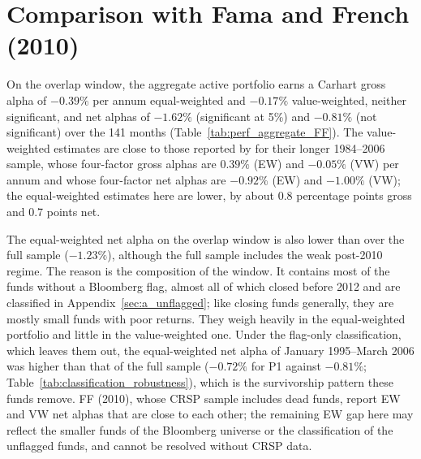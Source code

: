 \documentclass[12pt, oneside]{report}
\begin{document}








\section{Comparison with Fama and French (2010)}
\label{sec:ff_comparison}

\noindent On the overlap window, the aggregate active portfolio earns a
Carhart gross alpha of $-0.39\%$ per annum equal-weighted and $-0.17\%$
value-weighted, neither significant, and net alphas of $-1.62\%$
(significant at 5\%) and $-0.81\%$ (not significant) over the 141
months (Table~\ref{tab:perf_aggregate_FF}). The value-weighted estimates
are close to those reported by \textcite{FamaFrench2010} for their longer
1984--2006 sample, whose four-factor gross alphas are $0.39\%$ (EW) and
$-0.05\%$ (VW) per annum and whose four-factor net alphas are $-0.92\%$
(EW) and $-1.00\%$ (VW); the equal-weighted estimates here are lower, by
about 0.8 percentage points gross and 0.7 points net.

The equal-weighted net alpha on the overlap window is also lower than
over the full sample ($-1.23\%$), although the full sample includes the
weak post-2010 regime. The reason is the composition of the window. It
contains most of the funds without a Bloomberg flag, almost all of which
closed before 2012 and are classified in
Appendix~\ref{sec:a_unflagged}; like closing funds generally, they are
mostly small funds with poor returns. They weigh heavily in the
equal-weighted portfolio and little in the value-weighted one. Under the
flag-only classification, which leaves them out, the equal-weighted net
alpha of January 1995--March 2006 was higher than that of the full sample ($-0.72\%$
for P1 against $-0.81\%$; Table~\ref{tab:classification_robustness}),
which is the survivorship pattern these funds remove. FF (2010), whose
CRSP sample includes dead funds, report EW and VW net alphas that are
close to each other; the remaining EW gap here may reflect the smaller
funds of the Bloomberg universe or the classification of the unflagged
funds, and cannot be resolved without CRSP data.
\end{document}
